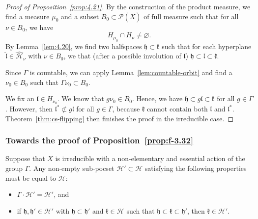 \begin{proof}[Proof of Proposition~\ref{prop:4.21}]
  By the construction of the product measure, we find a measure \(\mu_0\) and a subset \(B_0 \subset \mathcal{P}(\bar X)\) of full measure such that for all \(\nu \in B_0\), we have
  \[
    H_{\mu_0} \cap H_\nu \neq \varnothing.
  \]
  By Lemma~\ref{lem:4.20}, we find two halfspaces \(\mathfrak{h} \subset \mathfrak{k}\) such that for each hyperplane \(\mathfrak{\hat l} \in \mathcal{\hat H}_\nu\) with \(\nu \in B_0\), we that (after a possible involution of \(\mathfrak{l}\)) \(\mathfrak{h} \subset \mathfrak{l} \subset \mathfrak{k}\).

  Since \(\Gamma\) is countable, we can apply Lemma~\ref{lem:countable-orbit} and find a \(\nu_0 \in B_0\) such that \(\Gamma \nu_0 \subset B_0\). 

  We fix an \(\mathfrak{l} \in H_{\nu_0}\). We know that \(g\nu_0 \in B_0\). Hence, we have \(\mathfrak{h} \subset g\mathfrak{l} \subset \mathfrak{k}\) for all \(g \in \Gamma\). However, then \(\mathfrak{l}^\ast \not \subset g\mathfrak{l}\) for all \(g \in \Gamma\), because \(\mathfrak{k}\) cannot contain both \(\mathfrak{l}\) and \(\mathfrak{l}^\ast\). Theorem~\ref{thm:cs-flipping} then finishes the proof in the irreducible case.
\end{proof}

\subsubsection*{Towards the proof of Proposition~\ref{prop:f-3.32}}

\begin{lemma}
  \label{lem:f-3.31}
  Suppose that \(X\) is irreducible with a non-elementary and essential action of the group \(\Gamma\). Any non-empty sub-pocset \(\mathcal{H}' \subset  \mathcal{H}\) satisfying the following properties must be equal to \(\mathcal{H}\):
  \begin{itemize}
  \item \(\Gamma \cdot \mathcal{H}' = \mathcal{H}'\), and
  \item if \(\mathfrak{h}, \mathfrak{h}' \in \mathcal{H}'\) with \(\mathfrak{h} \subset \mathfrak{h}'\) and \(\mathfrak{k} \in \mathcal{H}\) such that \(\mathfrak{h} \subset \mathfrak{k} \subset \mathfrak{h}'\), then \(\mathfrak{k} \in \mathcal{H}'\).
  \end{itemize}
\end{lemma}

